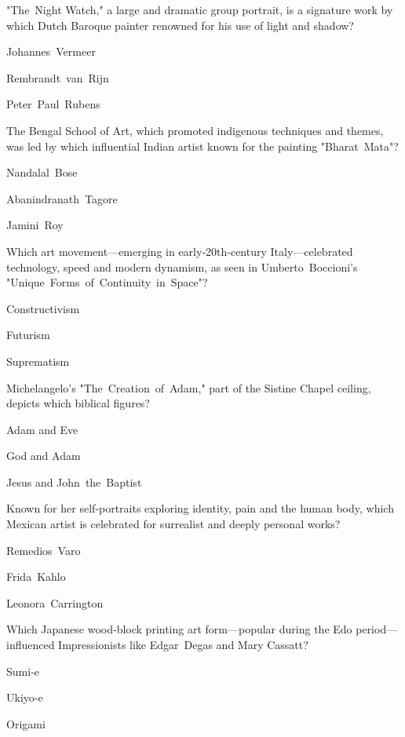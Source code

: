 \begin{enhancedmcq}{"The Night Watch," a large and dramatic group portrait, is a signature work by which Dutch Baroque painter renowned for his use of light and shadow?}
\item Johannes Vermeer
\item Rembrandt van Rijn
\item Peter Paul Rubens

\end{enhancedmcq}
\begin{enhancedmcq}{The Bengal School of Art, which promoted indigenous techniques and themes, was led by which influential Indian artist known for the painting "Bharat Mata"?}
\item Nandalal Bose
\item Abanindranath Tagore
\item Jamini Roy

\end{enhancedmcq}
\begin{enhancedmcq}{Which art movement—emerging in early‑20th‑century Italy—celebrated technology, speed and modern dynamism, as seen in Umberto Boccioni's "Unique Forms of Continuity in Space"?}
\item Constructivism
\item Futurism
\item Suprematism

\end{enhancedmcq}
\begin{enhancedmcq}{Michelangelo's "The Creation of Adam," part of the Sistine Chapel ceiling, depicts which biblical figures?}
\item Adam and Eve
\item God and Adam
\item Jesus and John the Baptist

\end{enhancedmcq}
\begin{enhancedmcq}{Known for her self‑portraits exploring identity, pain and the human body, which Mexican artist is celebrated for surrealist and deeply personal works?}
\item Remedios Varo
\item Frida Kahlo
\item Leonora Carrington

\end{enhancedmcq}
\begin{enhancedmcq}{Which Japanese wood‑block printing art form—popular during the Edo period—influenced Impressionists like Edgar Degas and Mary Cassatt?}
\item Sumi‑e
\item Ukiyo‑e
\item Origami

\end{enhancedmcq}
